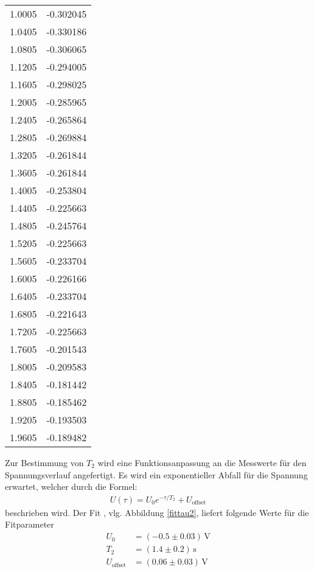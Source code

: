 \begin{table}
\begin{tabular}{c|c}
    1.0005&-0.302045\\
    1.0405&-0.330186\\
    1.0805&-0.306065\\
    1.1205&-0.294005\\
    1.1605&-0.298025\\
    1.2005&-0.285965\\
    1.2405&-0.265864\\
    1.2805&-0.269884\\
    1.3205&-0.261844\\
    1.3605&-0.261844\\
    1.4005&-0.253804\\
    1.4405&-0.225663\\
    1.4805&-0.245764\\
    1.5205&-0.225663\\
    1.5605&-0.233704\\
    1.6005&-0.226166\\
    1.6405&-0.233704\\
    1.6805&-0.221643\\
    1.7205&-0.225663\\
    1.7605&-0.201543\\
    1.8005&-0.209583\\
    1.8405&-0.181442\\
    1.8805&-0.185462\\
    1.9205&-0.193503\\
    1.9605&-0.189482\\
    \bottomrule
  \end{tabular}
\end{table}

Zur Bestimmung von $T_2$ wird eine Funktionsanpassung an die Messwerte für
den Spannungsverlauf angefertigt. Es wird ein exponentieller Abfall
für die Spannung erwartet, welcher durch die Formel:
\begin{align}
    \label{fitt2}
    U(\tau)=U_0 e^{-\tau / T_2}+U_\text{offset}
\end{align}
beschrieben wird.
Der Fit , vlg. Abbildung \ref{fittau2},  liefert folgende Werte für die Fitparameter
\begin{align*}
    U_0&=(-0.5 \pm 0.03) \, \text{V}\\
    T_2&=(1.4 \pm 0.2) \, \text{s}\\
    U_\text{offset}&=(0.06 \pm 0.03) \, \text{V}
\end{align*}



